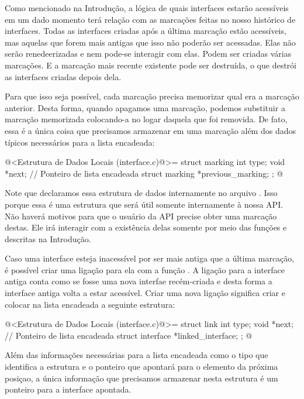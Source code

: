 
Como mencionado na Introdução, a lógica de quais interfaces estarão
acessíveis em um dado momento terá relação com as marcações feitas no
nosso histórico de interfaces. Todas as interfaces criadas após a
última marcação estão acessíveis, mas aquelas que forem mais antigas
que isso não poderão ser acessadas. Elas não serão renedeerizadas e
nem pode-se interagir com elas. Podem ser criadas várias marcações. E
a marcação mais recente existente pode ser destruída, o que destrói
as interfaces criadas depois dela.

Para que isso seja possível, cada marcação precisa memorizar qual era
a marcação anterior. Desta forma, quando apagamos uma marcação,
podemos substituir a marcação memorizada colocando-a no logar daquela
que foi removida. De fato, essa é a única coisa que precisamos
armazenar em uma marcação além dos dados típicos necessários para a
lista encadeada:

\iniciocodigo
@<Estrutura de Dados Locais (interface.c)@>=
struct marking {
  int type;
  void *next; // Ponteiro de lista encadeada
  struct marking *previous_marking;
};
@
\fimcodigo

Note que declaramos essa estrutura de dados internamente no arquivo
. Isso porque essa é uma estrutura que será
útil somente internamente à nossa API. Não haverá motivos para que o
usuário da API precise obter uma marcação destas. Ele irá interagir
com a existência delas somente por meio das funções
 e
 descritas na Introdução.


Caso uma interface esteja inacessível por ser mais antiga que a última
marcação, é possível criar uma ligação para ela com a função
. A ligação para a interface antiga
conta como se fosse uma nova interfae recém-criada e desta forma a
interface antiga volta a estar acessível. Criar uma nova ligação
significa criar e colocar na lista encadeada a seguinte estrutura:

\iniciocodigo
@<Estrutura de Dados Locais (interface.c)@>=
struct link {
  int type;
  void *next; // Ponteiro de lista encadeada
  struct interface *linked_interface;
};
@
\fimcodigo

Além das informações necessárias para a lista encadeada como o tipo
que identifica a estrutura e o ponteiro que apontará para o elemento
da próxima posiçao, a única informação que precisamos armazenar nesta
estrutura é um ponteiro para a interface apontada.

